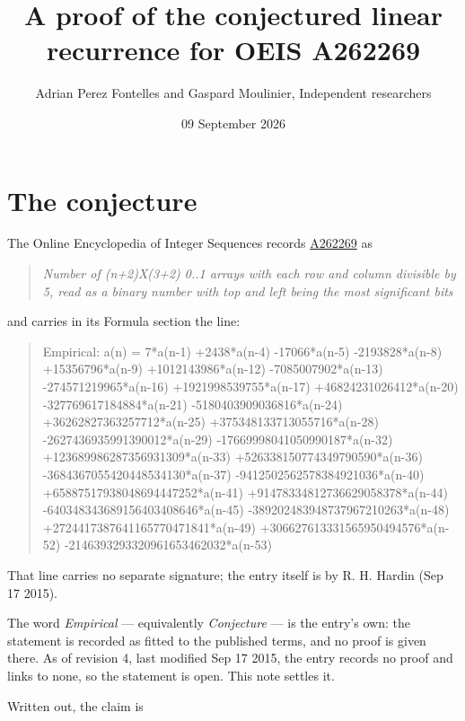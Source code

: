 \documentclass[11pt]{article}
\title{A proof of the conjectured linear recurrence for OEIS A262269}
\author{Adrian Perez Fontelles and Gaspard Moulinier, Independent researchers}
\date{09 September 2026}
\theoremstyle{definition}
\begin{document}
\maketitle
\section{The conjecture}

The Online Encyclopedia of Integer Sequences records \href{https://oeis.org/A262269}{A262269} as

\begin{quote}\itshape Number of (n+2)X(3+2) 0..1 arrays with each row and column divisible by 5, read as a binary number with top and left being the most significant bits\end{quote}

and carries in its Formula section the line:

\begin{quote}\ttfamily Empirical: a(n) = 7*a(n-1) +2438*a(n-4) -17066*a(n-5) -2193828*a(n-8) +15356796*a(n-9) +1012143986*a(n-12) -7085007902*a(n-13) -274571219965*a(n-16) +1921998539755*a(n-17) +46824231026412*a(n-20) -327769617184884*a(n-21) -5180403909036816*a(n-24) +36262827363257712*a(n-25) +375348133713055716*a(n-28) -2627436935991390012*a(n-29) -17669998041050990187*a(n-32) +123689986287356931309*a(n-33) +526338150774349790590*a(n-36) -3684367055420448534130*a(n-37) -9412502562578384921036*a(n-40) +65887517938048694447252*a(n-41) +91478334812736629058378*a(n-44) -640348343689156403408646*a(n-45) -389202483948737967210263*a(n-48) +2724417387641165770471841*a(n-49) +306627613331565950494576*a(n-52) -2146393293320961653462032*a(n-53)\end{quote}

That line carries no separate signature; the entry itself is by R. H. Hardin (Sep 17 2015).

The word {\itshape Empirical} --- equivalently {\itshape Conjecture} --- is the entry's own: the statement is recorded as fitted to the published terms, and no proof is given there. As of revision 4, last modified Sep 17 2015, the entry records no proof and links to none, so the statement is open. This note settles it.

Written out, the claim is
\end{document}
